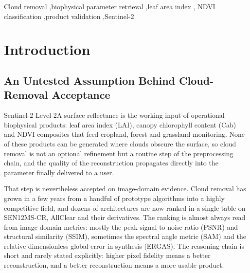 \documentclass[a4paper,fleqn]{cas-dc}
\begin{document}

\begin{keywords}
Cloud removal \sep biophysical parameter retrieval \sep leaf area index \sep
NDVI classification \sep product validation \sep Sentinel-2
\end{keywords}

\maketitle

\section{Introduction}

\subsection{An Untested Assumption Behind Cloud-Removal Acceptance}

Sentinel-2 Level-2A surface reflectance is the working input of operational biophysical products: leaf area index (LAI), canopy chlorophyll content (Cab) and NDVI composites that feed cropland, forest and grassland monitoring. None of these products can be generated where clouds obscure the surface, so cloud removal is not an optional refinement but a routine step of the preprocessing chain, and the quality of the reconstruction propagates directly into the parameter finally delivered to a user.

That step is nevertheless accepted on image-domain evidence. Cloud removal has grown in a few years from a handful of prototype algorithms into a highly competitive field, and dozens of architectures are now ranked in a single table on SEN12MS-CR, AllClear and their derivatives. The ranking is almost always read from image-domain metrics: mostly the peak signal-to-noise ratio (PSNR) and structural similarity (SSIM), sometimes the spectral angle metric (SAM) and the relative dimensionless global error in synthesis (ERGAS). The reasoning chain is short and rarely stated explicitly: higher pixel fidelity means a better reconstruction, and a better reconstruction means a more usable product.
\end{document}
